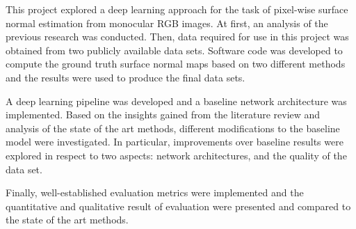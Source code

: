This project explored a deep learning approach for the task of pixel-wise surface normal estimation from monocular RGB images. At first, an analysis of the previous research was conducted. Then, data required for use in this project was obtained from two publicly available data sets. Software code was developed to compute the ground truth surface normal maps based on two different methods and the results were used to produce the final data sets.

A deep learning pipeline was developed and a baseline network architecture was implemented. Based on the insights gained from the literature review and analysis of the state of the art methods, different modifications to the baseline model were investigated. In particular, improvements over baseline results were explored in respect to two aspects: network architectures, and the quality of the data set.

Finally, well-established evaluation metrics were implemented and the quantitative and qualitative result of evaluation were presented and compared to the state of the art methods.  
